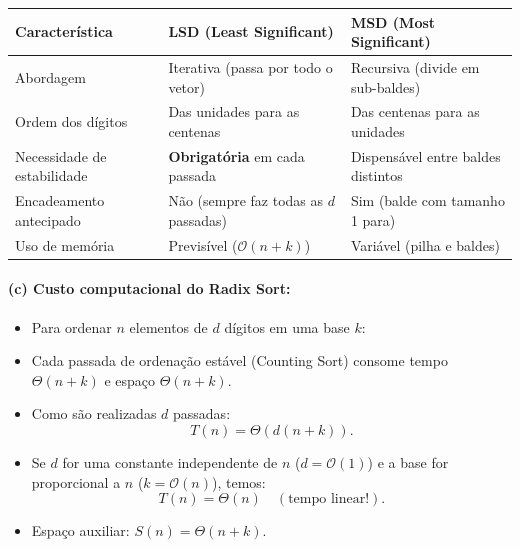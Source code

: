 \documentclass[11pt,a4paper]{article}
\begin{document}
\begin{teoria}
\begin{center}
\small
\begin{tabular}{p{3.8cm}p{5.5cm}p{5.5cm}}
\toprule
\textbf{Característica} & \textbf{LSD (Least Significant)} & \textbf{MSD (Most Significant)} \\
\midrule
Abordagem & Iterativa (passa por todo o vetor) & Recursiva (divide em sub-baldes) \\
Ordem dos dígitos & Das unidades para as centenas & Das centenas para as unidades \\
Necessidade de estabilidade & \textbf{Obrigatória} em cada passada & Dispensável entre baldes distintos \\
Encadeamento antecipado & Não (sempre faz todas as $d$ passadas) & Sim (balde com tamanho 1 para) \\
Uso de memória & Previsível ($\mathcal{O}(n + k)$) & Variável (pilha e baldes) \\
\bottomrule
\end{tabular}
\end{center}
\end{teoria}

\paragraph{(c) Custo computacional do Radix Sort:}
\begin{itemize}
    \item Para ordenar $n$ elementos de $d$ dígitos em uma base $k$:
    \item Cada passada de ordenação estável (Counting Sort) consome tempo $\Theta(n + k)$ e espaço $\Theta(n + k)$.
    \item Como são realizadas $d$ passadas:
    \[
        T(n) = \Theta(d(n + k)).
    \]
    \item Se $d$ for uma constante independente de $n$ ($d = \mathcal{O}(1)$) e a base for proporcional a $n$ ($k = \mathcal{O}(n)$), temos:
    \[
        T(n) = \Theta(n) \quad (\text{tempo linear!}).
    \]
    \item Espaço auxiliar: $S(n) = \Theta(n + k)$.
\end{itemize}

\vspace{0.4cm}

\end{document}
